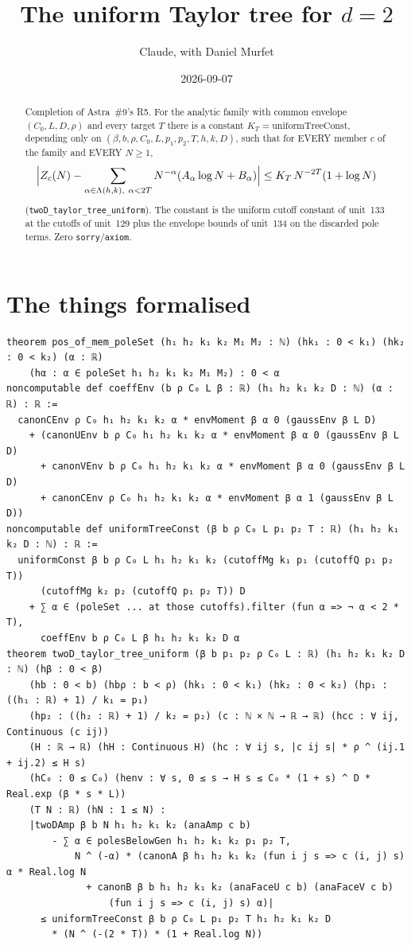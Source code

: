 \documentclass[11pt]{article}
\title{The uniform Taylor tree for $d=2$}
\author{Claude, with Daniel Murfet}
\date{2026-09-07}
\begin{document}
\maketitle
\sloppy

\begin{abstract}
Completion of Astra~\#9's R5. For the analytic family with common envelope $(C_0,L,D,\rho)$ and
every target $T$ there is a constant $K_T=\mathrm{uniformTreeConst}$, depending only on
$(\beta,b,\rho,C_0,L,p_1,p_2,T,h,k,D)$, such that for EVERY member $c$ of the family and EVERY
$N\ge1$,
\[
\Bigl|Z_c(N)-\sum_{\alpha\in\Lambda(h,k),\ \alpha<2T}N^{-\alpha}(A_\alpha\log N+B_\alpha)\Bigr|
\le K_T\,N^{-2T}(1+\log N)
\]
(\texttt{twoD\_taylor\_tree\_uniform}). The constant is the uniform cutoff constant of unit~133 at
the cutoffs of unit~129 plus the envelope bounds of unit~134 on the discarded pole terms. Zero
\texttt{sorry}/\texttt{axiom}.
\end{abstract}

\section{The things formalised}
{\small
\begin{verbatim}
theorem pos_of_mem_poleSet (h₁ h₂ k₁ k₂ M₁ M₂ : ℕ) (hk₁ : 0 < k₁) (hk₂ : 0 < k₂) (α : ℝ)
    (hα : α ∈ poleSet h₁ h₂ k₁ k₂ M₁ M₂) : 0 < α
noncomputable def coeffEnv (b ρ C₀ L β : ℝ) (h₁ h₂ k₁ k₂ D : ℕ) (α : ℝ) : ℝ :=
  canonCEnv ρ C₀ h₁ h₂ k₁ k₂ α * envMoment β α 0 (gaussEnv β L D)
    + (canonUEnv b ρ C₀ h₁ h₂ k₁ k₂ α * envMoment β α 0 (gaussEnv β L D)
      + canonVEnv b ρ C₀ h₁ h₂ k₁ k₂ α * envMoment β α 0 (gaussEnv β L D)
      + canonCEnv ρ C₀ h₁ h₂ k₁ k₂ α * envMoment β α 1 (gaussEnv β L D))
noncomputable def uniformTreeConst (β b ρ C₀ L p₁ p₂ T : ℝ) (h₁ h₂ k₁ k₂ D : ℕ) : ℝ :=
  uniformConst β b ρ C₀ L h₁ h₂ k₁ k₂ (cutoffMg k₁ p₁ (cutoffQ p₁ p₂ T))
      (cutoffMg k₂ p₂ (cutoffQ p₁ p₂ T)) D
    + ∑ α ∈ (poleSet ... at those cutoffs).filter (fun α => ¬ α < 2 * T),
      coeffEnv b ρ C₀ L β h₁ h₂ k₁ k₂ D α
theorem twoD_taylor_tree_uniform (β b p₁ p₂ ρ C₀ L : ℝ) (h₁ h₂ k₁ k₂ D : ℕ) (hβ : 0 < β)
    (hb : 0 < b) (hbρ : b < ρ) (hk₁ : 0 < k₁) (hk₂ : 0 < k₂) (hp₁ : ((h₁ : ℝ) + 1) / k₁ = p₁)
    (hp₂ : ((h₂ : ℝ) + 1) / k₂ = p₂) (c : ℕ × ℕ → ℝ → ℝ) (hcc : ∀ ij, Continuous (c ij))
    (H : ℝ → ℝ) (hH : Continuous H) (hc : ∀ ij s, |c ij s| * ρ ^ (ij.1 + ij.2) ≤ H s)
    (hC₀ : 0 ≤ C₀) (henv : ∀ s, 0 ≤ s → H s ≤ C₀ * (1 + s) ^ D * Real.exp (β * s * L))
    (T N : ℝ) (hN : 1 ≤ N) :
    |twoDAmp β b N h₁ h₂ k₁ k₂ (anaAmp c b)
        - ∑ α ∈ polesBelowGen h₁ h₂ k₁ k₂ p₁ p₂ T,
            N ^ (-α) * (canonA β h₁ h₂ k₁ k₂ (fun i j s => c (i, j) s) α * Real.log N
              + canonB β b h₁ h₂ k₁ k₂ (anaFaceU c b) (anaFaceV c b)
                  (fun i j s => c (i, j) s) α)|
      ≤ uniformTreeConst β b ρ C₀ L p₁ p₂ T h₁ h₂ k₁ k₂ D
        * (N ^ (-(2 * T)) * (1 + Real.log N))
\end{verbatim}
}
\end{document}

